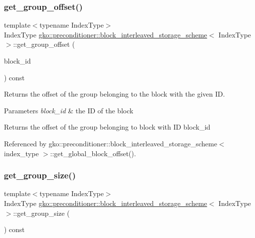 \subsubsection{\texorpdfstring{get\+\_\+group\+\_\+offset()}{get\_group\_offset()}}
{\footnotesize\ttfamily template$<$typename Index\+Type$>$ \\
Index\+Type \hyperlink{structgko_1_1preconditioner_1_1block__interleaved__storage__scheme}{gko\+::preconditioner\+::block\+\_\+interleaved\+\_\+storage\+\_\+scheme}$<$ Index\+Type $>$\+::get\+\_\+group\+\_\+offset (\begin{DoxyParamCaption}\item[{Index\+Type}]{block\+\_\+id }\end{DoxyParamCaption}) const\hspace{0.3cm}{\ttfamily [noexcept]}}



Returns the offset of the group belonging to the block with the given ID. 


\begin{DoxyParams}{Parameters}
{\em block\+\_\+id} & the ID of the block\\
\hline
\end{DoxyParams}
\begin{DoxyReturn}{Returns}
the offset of the group belonging to block with ID {\ttfamily block\+\_\+id} 
\end{DoxyReturn}


Referenced by gko\+::preconditioner\+::block\+\_\+interleaved\+\_\+storage\+\_\+scheme$<$ index\+\_\+type $>$\+::get\+\_\+global\+\_\+block\+\_\+offset().

\mbox{\label{structgko_1_1preconditioner_1_1block__interleaved__storage__scheme_af5eee19f00b1cd4c378ac3410be72093}} 
\subsubsection{\texorpdfstring{get\+\_\+group\+\_\+size()}{get\_group\_size()}}
{\footnotesize\ttfamily template$<$typename Index\+Type$>$ \\
Index\+Type \hyperlink{structgko_1_1preconditioner_1_1block__interleaved__storage__scheme}{gko\+::preconditioner\+::block\+\_\+interleaved\+\_\+storage\+\_\+scheme}$<$ Index\+Type $>$\+::get\+\_\+group\+\_\+size (\begin{DoxyParamCaption}{ }\end{DoxyParamCaption}) const\hspace{0.3cm}{\ttfamily [noexcept]}}



